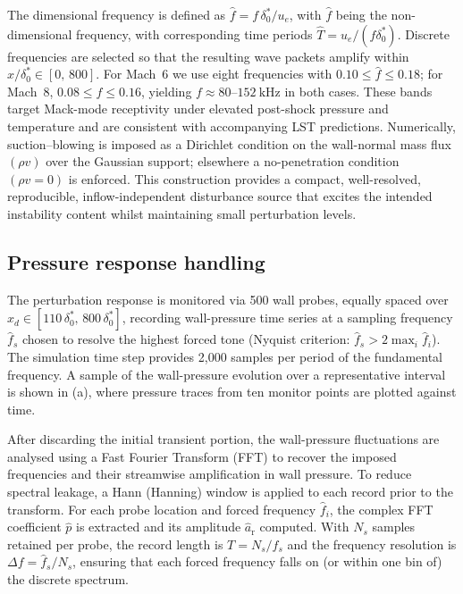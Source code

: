 The dimensional frequency is defined as $\hat{f} = f\,\delta^{*}_0/u_e$, with $\hat{f}$ being the non-dimensional frequency, with corresponding time periods $\hat{T} = u_e / (f \delta_0^*)$. Discrete frequencies are selected so that the resulting wave packets amplify within $x/\delta_0^{*}\in[0,\,800]$. For Mach~6 we use eight frequencies with $0.10 \le \hat{f} \le 0.18$; for Mach~8, $0.08 \le \hat{f} \le 0.16$, yielding $f \approx 80$--$152~\mathrm{kHz}$ in both cases. These bands target Mack-mode receptivity under elevated post-shock pressure and temperature and are consistent with accompanying \gls{LST} predictions. Numerically, suction--blowing is imposed as a Dirichlet condition on the wall-normal mass flux $(\rho v)$ over the Gaussian support; elsewhere a no-penetration condition $(\rho v=0)$ is enforced. This construction provides a compact, well-resolved, reproducible, inflow-independent disturbance source that excites the intended instability content whilst maintaining small perturbation levels.

\subsection{Pressure response handling}

The perturbation response is monitored via 500 wall probes, equally spaced over $x_d \in [110\,\delta^{*}_{0},\,800\,\delta^{*}_{0}]$, recording wall-pressure time series at a sampling frequency $\hat{f}_s$ chosen to resolve the highest forced tone (Nyquist criterion: $\hat{f}_s> 2\max_i \hat{f}_i$). The simulation time step provides 2,000 samples per period of the fundamental frequency. A sample of the wall-pressure evolution over a representative interval is shown in (a), where pressure traces from ten monitor points are plotted against time.


After discarding the initial transient portion, the wall-pressure fluctuations are analysed using a Fast Fourier Transform (FFT) to recover the imposed frequencies and their streamwise amplification in wall pressure. To reduce spectral leakage, a Hann (Hanning) window is applied to each record prior to the transform. For each probe location and forced frequency $\hat{f}_i$, the complex FFT coefficient $\widehat{p}$ is extracted and its amplitude $\hat{a}_{\mathrm{r}}$ computed. With $N_s$ samples retained per probe, the record length is $T = N_s/\hat{f}_s$ and the frequency resolution is $\Delta f = \hat{f}_s/N_s$, ensuring that each forced frequency falls on (or within one bin of) the discrete spectrum.

